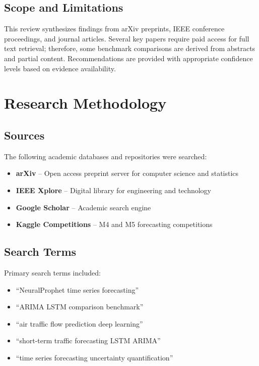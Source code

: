 \documentclass[12pt,a4paper]{article}
\begin{document}
\subsection{Scope and Limitations}

This review synthesizes findings from arXiv preprints, IEEE conference proceedings, and journal articles. Several key papers require paid access for full text retrieval; therefore, some benchmark comparisons are derived from abstracts and partial content. Recommendations are provided with appropriate confidence levels based on evidence availability.


\section{Research Methodology}

\subsection{Sources}

The following academic databases and repositories were searched:

\begin{itemize}
    \item \textbf{arXiv} -- Open access preprint server for computer science and statistics
    \item \textbf{IEEE Xplore} -- Digital library for engineering and technology
    \item \textbf{Google Scholar} -- Academic search engine
    \item \textbf{Kaggle Competitions} -- M4 and M5 forecasting competitions
\end{itemize}

\subsection{Search Terms}

Primary search terms included:
\begin{itemize}
    \item ``NeuralProphet time series forecasting''
    \item ``ARIMA LSTM comparison benchmark''
    \item ``air traffic flow prediction deep learning''
    \item ``short-term traffic forecasting LSTM ARIMA''
    \item ``time series forecasting uncertainty quantification''
\end{itemize}
\end{document}
